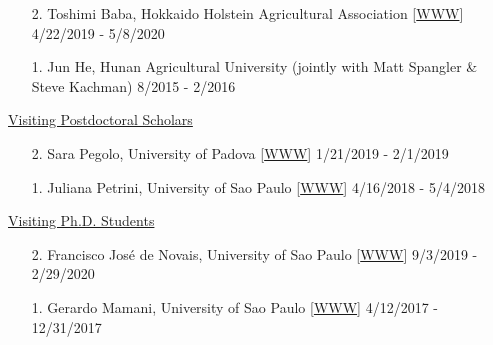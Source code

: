 \documentclass[margin,line,10pt]{res}
\begin{document}
\begin{resume}
\begin{enumerate}
  \vspace{0.3cm}

      
\item [2.] Toshimi Baba, Hokkaido Holstein Agricultural Association [\textcolor{blue}{\href{https://researchmap.jp/t-baba/?lang=english}{WWW}}]  \hfill  4/22/2019 - 5/8/2020
  
  \vspace{0.3cm}

\item [1.] Jun He, Hunan Agricultural University (jointly with Matt Spangler \& Steve Kachman)  \hfill  8/2015 - 2/2016 
\end{enumerate}



\begin{flushleft}
\hspace{0.2cm} \underline{Visiting Postdoctoral Scholars}
\end{flushleft}
\begin{enumerate}
\item [2.] Sara Pegolo,  University of Padova [\textcolor{blue}{\href{https://www.researchgate.net/profile/Sara_Pegolo}{WWW}}]  \hfill 1/21/2019 - 2/1/2019
  
  \vspace{0.3cm}

\item [1.] Juliana Petrini,  University of Sao Paulo  [\textcolor{blue}{\href{https://www.researchgate.net/profile/Juliana_Petrini}{WWW}}]  \hfill  4/16/2018 - 5/4/2018
\end{enumerate}






\begin{flushleft}
\hspace{0.2cm} \underline{Visiting Ph.D. Students}
\end{flushleft}
\begin{enumerate}
\item [2.] Francisco Jos\'{e} de Novais,  University of Sao Paulo [\textcolor{blue}{\href{https://fjnovais.github.io/}{WWW}}]  \hfill  9/3/2019 - 2/29/2020

\vspace{0.3cm}

\item [1.] Gerardo Mamani, University of Sao Paulo  [\textcolor{blue}{\href{https://github.com/gerardocorn}{WWW}}]  \hfill 4/12/2017 - 12/31/2017
\end{enumerate}




\end{resume}
\end{document}
